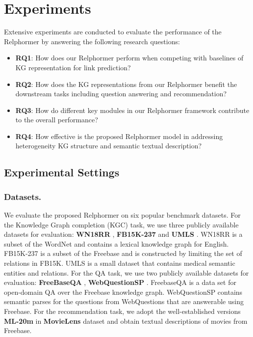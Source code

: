 \documentclass[sigconf]{acmart}
\begin{document}
\section{Experiments}
\label{sec:exp}
Extensive experiments are conducted to evaluate the performance
of the Relphormer by answering the following research questions:
\begin{itemize}
    \item \textbf{RQ1}: How does our Relphormer perform when competing with baselines of KG representation for link prediction?
    \item \textbf{RQ2}: How does the KG representations from our Relphormer benefit the downstream tasks including question answering and recommendation?
    \item \textbf{RQ3}: How do different key modules in our Relphormer framework contribute to the overall performance?
    \item \textbf{RQ4}: How effective is the proposed Relphormer model in addressing heterogeneity KG structure and semantic textual description?
\end{itemize}



\subsection{Experimental Settings}
\subsubsection{\textbf{Datasets.}}
We evaluate the proposed Relphormer on six popular benchmark datasets.
For the Knowledge Graph completion (KGC) task, we use three publicly available datasets for evaluation: \textbf{WN18RR} \cite{WN18RR},  \textbf{FB15K-237} \cite{FB15K237} and \textbf{UMLS} \cite{UMLS}. 
WN18RR is a subset of the WordNet and contains a lexical knowledge graph for English. 
FB15K-237 is a subset of the Freebase and is constructed by limiting the set of relations in FB15K.
UMLS is a small dataset that contains medical semantic entities and relations.
For the QA task, we use two publicly available datasets for evaluation: \textbf{FreeBaseQA} \cite{FreebaseQA}, \textbf{WebQuestionSP} \cite{WebQuestionsSP}.
FreebaseQA is a data set for open-domain QA over the Freebase knowledge graph.
WebQuestionSP contains semantic parses for the questions from WebQuestions that are answerable using Freebase.
For the recommendation task, we adopt the well-established versions \textbf{ML-20m} in \textbf{MovieLens} \cite{MovieLens}  dataset and obtain textual descriptions of movies from Freebase.
\end{document}
